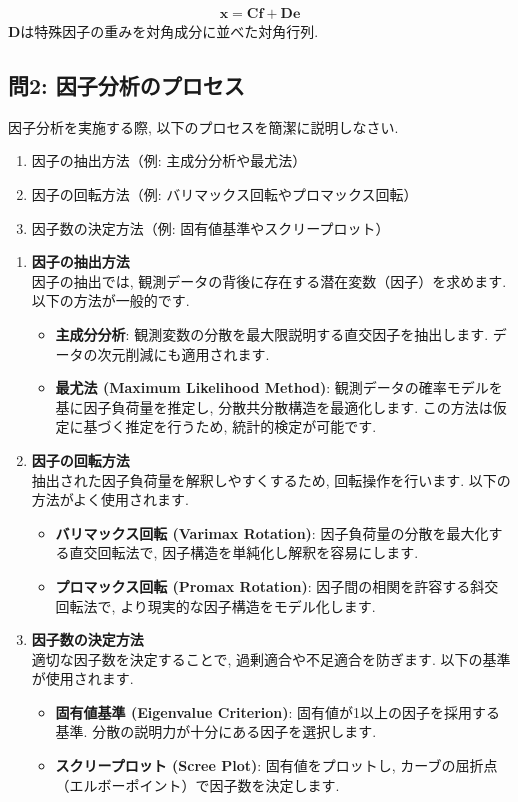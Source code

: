 \documentclass[dvipdfmx, 10pt]{jsarticle}
\begin{document}
\begin{align*}
    \mathbf{x} = \mathbf{C} \mathbf{f} + \mathbf{D} \mathbf{e}
\end{align*}
\(\mathbf{D}\)は特殊因子の重みを対角成分に並べた対角行列. 

\subsection*{問2: 因子分析のプロセス}
因子分析を実施する際, 以下のプロセスを簡潔に説明しなさい. 
\begin{enumerate}
    \item 因子の抽出方法（例: 主成分分析や最尤法）
    \item 因子の回転方法（例: バリマックス回転やプロマックス回転）
    \item 因子数の決定方法（例: 固有値基準やスクリープロット）
\end{enumerate}

\begin{enumerate}
    \item \textbf{因子の抽出方法} \\
    因子の抽出では, 観測データの背後に存在する潜在変数（因子）を求めます. 以下の方法が一般的です. 
    \begin{itemize}
        \item \textbf{主成分分析}: 観測変数の分散を最大限説明する直交因子を抽出します. データの次元削減にも適用されます. 
        \item \textbf{最尤法 (Maximum Likelihood Method)}: 観測データの確率モデルを基に因子負荷量を推定し, 分散共分散構造を最適化します. この方法は仮定に基づく推定を行うため, 統計的検定が可能です. 
    \end{itemize}

    \item \textbf{因子の回転方法} \\
    抽出された因子負荷量を解釈しやすくするため, 回転操作を行います. 以下の方法がよく使用されます. 
    \begin{itemize}
        \item \textbf{バリマックス回転 (Varimax Rotation)}: 因子負荷量の分散を最大化する直交回転法で, 因子構造を単純化し解釈を容易にします. 
        \item \textbf{プロマックス回転 (Promax Rotation)}: 因子間の相関を許容する斜交回転法で, より現実的な因子構造をモデル化します. 
    \end{itemize}

    \item \textbf{因子数の決定方法} \\
    適切な因子数を決定することで, 過剰適合や不足適合を防ぎます. 以下の基準が使用されます. 
    \begin{itemize}
        \item \textbf{固有値基準 (Eigenvalue Criterion)}: 固有値が1以上の因子を採用する基準. 分散の説明力が十分にある因子を選択します. 
        \item \textbf{スクリープロット (Scree Plot)}: 固有値をプロットし, カーブの屈折点（エルボーポイント）で因子数を決定します. 
    \end{itemize}
\end{enumerate}
\end{document}
